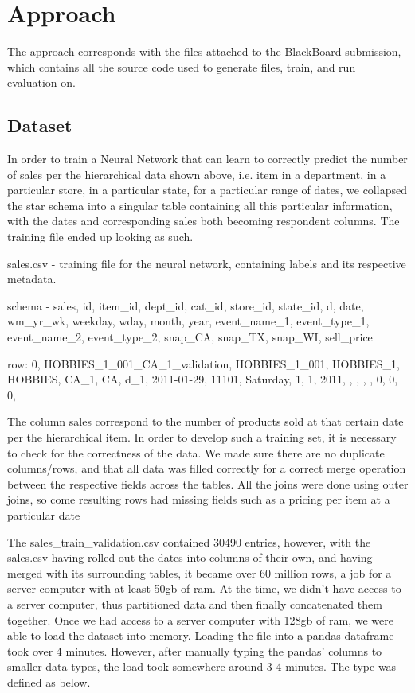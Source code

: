 \documentclass[10pt,twocolumn,letterpaper]{article}
\begin{document}
\section{Approach}
  The approach corresponds with the files attached to the BlackBoard submission,
  which contains all the source code used to generate files, train, and run
  evaluation on.

\subsection{Dataset}
In order to train a Neural Network that can learn to correctly predict the
number of sales per the hierarchical data shown above, i.e. item in a
department, in a particular store, in a particular state, for a particular range
of dates, we collapsed the star schema into a singular table containing all this
particular information, with the dates and corresponding sales both becoming
respondent columns. The training file ended up looking as such.

sales.csv - training file for the neural network, containing labels and its
respective metadata. 

\noindent schema - sales, id, item\_id, dept\_id, cat\_id, store\_id, state\_id, d, date, wm\_yr\_wk, weekday, wday, month, year, event\_name\_1, event\_type\_1, event\_name\_2, event\_type\_2, snap\_CA, snap\_TX, snap\_WI, sell\_price

 \noindent row: 0, HOBBIES\_1\_001\_CA\_1\_validation, HOBBIES\_1\_001, HOBBIES\_1, HOBBIES, CA\_1, CA, d\_1, 2011-01-29, 11101, Saturday, 1, 1, 2011, , , , , 0, 0, 0,

The column sales correspond to the number of products sold at that certain date
per the hierarchical item. In order to develop such a training set, it is
necessary to check for the correctness of the data. We made sure there are no
duplicate columns/rows, and that all data was filled correctly for a correct
merge operation between the respective fields across the tables. All the joins
were done using outer joins, so come resulting rows had missing fields such as a
pricing per item at a particular date

 The sales\_train\_validation.csv contained 30490 entries, however, with the
sales.csv having rolled out the dates into columns of their own, and having
merged with its surrounding tables, it became over 60 million rows, a job for a
server computer with at least 50gb of ram. At the time, we didn’t have access to
a server computer, thus partitioned data and then finally concatenated them
together. Once we had access to a server computer with 128gb of ram, we were
able to load the dataset into memory. Loading the file into a pandas dataframe
took over 4 minutes. However, after manually typing the pandas’ columns to
smaller data types, the load took somewhere around 3-4 minutes. The type was
defined as below.
\end{document}
